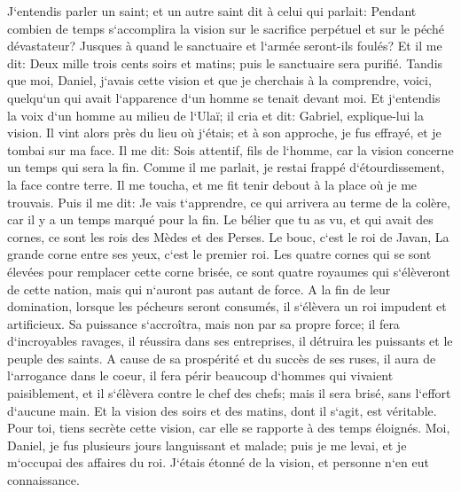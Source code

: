 \verse J`entendis parler un saint; et un autre saint dit à celui qui parlait: Pendant combien de temps s`accomplira la vision sur le sacrifice perpétuel et sur le péché dévastateur? Jusques à quand le sanctuaire et l`armée seront-ils foulés? 
\verse Et il me dit: Deux mille trois cents soirs et matins; puis le sanctuaire sera purifié. 
\verse Tandis que moi, Daniel, j`avais cette vision et que je cherchais à la comprendre, voici, quelqu`un qui avait l`apparence d`un homme se tenait devant moi. 
\verse Et j`entendis la voix d`un homme au milieu de l`Ulaï; il cria et dit: Gabriel, explique-lui la vision. 
\verse Il vint alors près du lieu où j`étais; et à son approche, je fus effrayé, et je tombai sur ma face. Il me dit: Sois attentif, fils de l`homme, car la vision concerne un temps qui sera la fin. 
\verse Comme il me parlait, je restai frappé d`étourdissement, la face contre terre. Il me toucha, et me fit tenir debout à la place où je me trouvais. 
\verse Puis il me dit: Je vais t`apprendre, ce qui arrivera au terme de la colère, car il y a un temps marqué pour la fin. 
\verse Le bélier que tu as vu, et qui avait des cornes, ce sont les rois des Mèdes et des Perses. 
\verse Le bouc, c`est le roi de Javan, La grande corne entre ses yeux, c`est le premier roi. 
\verse Les quatre cornes qui se sont élevées pour remplacer cette corne brisée, ce sont quatre royaumes qui s`élèveront de cette nation, mais qui n`auront pas autant de force. 
\verse A la fin de leur domination, lorsque les pécheurs seront consumés, il s`élèvera un roi impudent et artificieux. 
\verse Sa puissance s`accroîtra, mais non par sa propre force; il fera d`incroyables ravages, il réussira dans ses entreprises, il détruira les puissants et le peuple des saints. 
\verse A cause de sa prospérité et du succès de ses ruses, il aura de l`arrogance dans le coeur, il fera périr beaucoup d`hommes qui vivaient paisiblement, et il s`élèvera contre le chef des chefs; mais il sera brisé, sans l`effort d`aucune main. 
\verse Et la vision des soirs et des matins, dont il s`agit, est véritable. Pour toi, tiens secrète cette vision, car elle se rapporte à des temps éloignés. 
\verse Moi, Daniel, je fus plusieurs jours languissant et malade; puis je me levai, et je m`occupai des affaires du roi. J`étais étonné de la vision, et personne n`en eut connaissance. 

